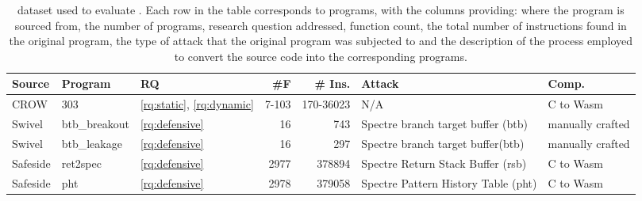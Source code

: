 




\begin{table}
\renewcommand\arraystretch{1.1}
\begin{adjustbox}{width=\linewidth,totalheight=\textheight, keepaspectratio}
    \begin{tabular}{p{1.2cm} | l | l | r | r | p{2cm} | p{1cm} }
        \hline
        Source & Program & RQ & \#F & \# Ins. & Attack & Comp. \\
        \hline \hline
        CROW & 303 & \ref{rq:static}, \ref{rq:dynamic} & 7-103 & 170-36023 & N/A & C to Wasm \\
        \hline
        Swivel & btb\_breakout & \ref{rq:defensive} & 16 & 743 & Spectre branch target buffer (btb) & manually crafted \\
        \hline
        Swivel & btb\_leakage & \ref{rq:defensive} & 16 & 297 & Spectre branch target buffer(btb) & manually crafted \\
        \hline
        Safeside & ret2spec & \ref{rq:defensive} & 2977 & 378894 & Spectre Return Stack Buffer (rsb) & C to Wasm \\
        \hline
        Safeside & pht & \ref{rq:defensive} & 2978 & 379058 & Spectre Pattern History Table (pht) & C to Wasm \\

    \end{tabular}
\end{adjustbox}
    
    \caption{\wasm dataset used to evaluate \tool. Each row in the table corresponds to programs, with the columns providing: where the program is sourced from, the number of programs, research question addressed, function count, the total number of instructions found in the original \wasm program, the type of attack that the original program was subjected to and the description of the process employed to convert the source code into the corresponding \wasm programs.}
    \label{tab:corpus}
\end{table}



